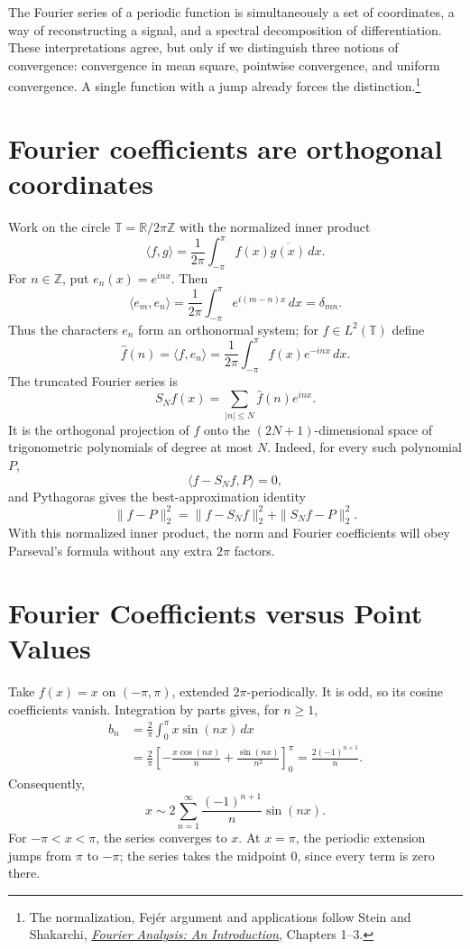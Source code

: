 
The Fourier series of a periodic function is simultaneously a set of coordinates, a way of reconstructing a signal, and a spectral decomposition of differentiation. These interpretations agree, but only if we distinguish three notions of convergence: convergence in mean square, pointwise convergence, and uniform convergence. A single function with a jump already forces the distinction.\footnote{The normalization, Fej\'er argument and applications follow Stein and Shakarchi, \href{https://books.google.com/books/about/Fourier_Analysis.html?id=FAOc24bTfGkC}{\emph{Fourier Analysis: An Introduction}}, Chapters 1--3.}

\section{Fourier coefficients are orthogonal coordinates}

Work on the circle \(\mathbb T=\mathbb R/2\pi\mathbb Z\) with the normalized inner product
\[
 \langle f,g\rangle
 =\frac1{2\pi}\int_{-\pi}^{\pi}
     f(x)\overline{g(x)}\,dx.
\]
For \(n\in\mathbb Z\), put \(e_n(x)=e^{inx}\). Then
\[
 \langle e_m,e_n\rangle
 =\frac1{2\pi}\int_{-\pi}^{\pi}e^{i(m-n)x}\,dx
 =\delta_{mn}.
\]
Thus the characters \(e_n\) form an orthonormal system; for \(f\in L^2(\mathbb T)\) define
\[
 \boxed{\widehat f(n)=\langle f,e_n\rangle
 =\frac1{2\pi}\int_{-\pi}^{\pi}f(x)e^{-inx}\,dx.}
\]
The truncated Fourier series is
\[
 S_Nf(x)=\sum_{|n|\le N}\widehat f(n)e^{inx}.
\]
It is the orthogonal projection of \(f\) onto the \((2N+1)\)-dimensional space of trigonometric polynomials of degree at most \(N\). Indeed, for every such polynomial \(P\),
\[
 \langle f-S_Nf,P\rangle=0,
\]
and Pythagoras gives the best-approximation identity
\[
 \boxed{\|f-P\|_2^2
 =\|f-S_Nf\|_2^2+\|S_Nf-P\|_2^2.}
\]
With this normalized inner product, the norm and Fourier coefficients will obey Parseval's formula without any extra \(2\pi\) factors.

\section{Fourier Coefficients versus Point Values}

Take \(f(x)=x\) on \((-\pi,\pi)\), extended \(2\pi\)-periodically. It is odd, so its cosine coefficients vanish. Integration by parts gives, for \(n\ge1\),
\[
\begin{aligned}
 b_n&=\frac2\pi\int_0^\pi x\sin(nx)\,dx\\
 &=\frac2\pi\left[
 -\frac{x\cos(nx)}n+\frac{\sin(nx)}{n^2}
 \right]_0^\pi
 =\frac{2(-1)^{n+1}}n.
\end{aligned}
\]
Consequently,
\[
 \boxed{x\sim2\sum_{n=1}^{\infty}
                 \frac{(-1)^{n+1}}n\sin(nx).}
\]
For \(-\pi<x<\pi\), the series converges to \(x\). At \(x=\pi\), the periodic extension jumps from \(\pi\) to \(-\pi\); the series takes the midpoint \(0\), since every term is zero there.

